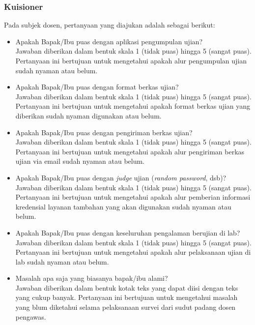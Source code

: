     \subsubsection{Kuisioner}
    Pada subjek dosen, pertanyaan yang diajukan adalah sebagai berikut:
    \begin{itemize}
        \item Apakah Bapak/Ibu puas dengan aplikasi pengumpulan ujian? \\
            Jawaban diberikan dalam bentuk skala 1 (tidak puas) hingga 5 (sangat
            puas). Pertanyaan ini bertujuan untuk mengetahui apakah alur
            pengumpulan ujian sudah nyaman atau belum.
            
        \item Apakah Bapak/Ibu puas dengan format berkas ujian? \\
            Jawaban diberikan dalam bentuk skala 1 (tidak puas) hingga 5 (sangat
            puas). Pertanyaan ini bertujuan untuk mengetahui apakah format
            berkas ujian yang diberikan sudah nyaman digunakan atau belum.
            
        \item Apakah Bapak/Ibu puas dengan pengiriman berkas ujian? \\
            Jawaban diberikan dalam bentuk skala 1 (tidak puas) hingga 5 (sangat
            puas). Pertanyaan ini bertujuan untuk mengetahui apakah alur
            pengiriman berkas ujian via email sudah nyaman atau belum.
            
        \item Apakah Bapak/Ibu puas dengan \textit{judge} ujian (\textit{random
        password}, dsb)? \\
            Jawaban diberikan dalam bentuk skala 1 (tidak puas) hingga 5 (sangat
            puas). Pertanyaan ini bertujuan untuk mengetahui apakah alur
            pemberian informasi kredensial layanan tambahan yang akan digunakan
            sudah nyaman atau belum.
            
        \item Apakah Bapak/Ibu puas dengan keseluruhan pengalaman berujian di
        lab? \\
            Jawaban diberikan dalam bentuk skala 1 (tidak puas) hingga 5 (sangat
            puas). Pertanyaan ini bertujuan untuk mengetahui apakah alur
            pelaksanaan ujian di lab sudah nyaman atau belum.
            
        \item Masalah apa saja yang biasanya bapak/ibu alami? \\
            Jawaban diberikan dalam bentuk kotak teks yang dapat diisi dengan
            teks yang cukup banyak. Pertanyaan ini bertujuan untuk mengetahui
            masalah yang blum diketahui selama pelaksanaan survei dari sudut
            padang dosen pengawas.
    \end{itemize}

